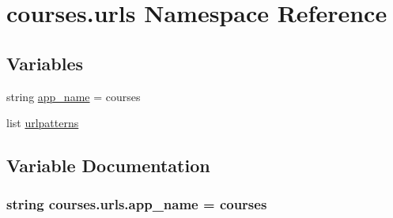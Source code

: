 \hypertarget{namespacecourses_1_1urls}{}\section{courses.\+urls Namespace Reference}
\label{namespacecourses_1_1urls}
\subsection*{Variables}
\begin{DoxyCompactItemize}
\item 
string \hyperlink{namespacecourses_1_1urls_aa353d0fd6a76ab69a4e7f0a015e637b5}{app\+\_\+name} = \textquotesingle{}courses\textquotesingle{}
\item 
list \hyperlink{namespacecourses_1_1urls_aacc66e14cddc63727182685f921b8726}{urlpatterns}
\end{DoxyCompactItemize}


\subsection{Variable Documentation}
\subsubsection[{\texorpdfstring{app\+\_\+name}{app_name}}]{\setlength{\rightskip}{0pt plus 5cm}string courses.\+urls.\+app\+\_\+name = \textquotesingle{}courses\textquotesingle{}}\hypertarget{namespacecourses_1_1urls_aa353d0fd6a76ab69a4e7f0a015e637b5}{}\label{namespacecourses_1_1urls_aa353d0fd6a76ab69a4e7f0a015e637b5}
